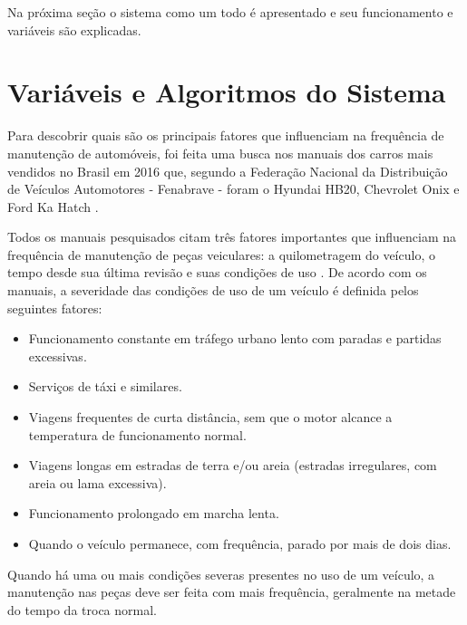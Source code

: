 \documentclass[12pt]{article}
\begin{document}
Na próxima seção o sistema como um todo é apresentado e seu funcionamento e
variáveis são explicadas.

\section{Variáveis e Algoritmos do Sistema} \label{sec:algoritmos}
Para descobrir quais são os principais fatores que influenciam na frequência de
manutenção de automóveis, foi feita uma busca nos manuais dos carros mais vendidos
no Brasil em 2016 que, segundo a Federação Nacional da Distribuição de Veículos
Automotores - Fenabrave - foram o Hyundai HB20, Chevrolet Onix e Ford Ka Hatch
\cite{fenabrave}.

Todos os manuais pesquisados citam três fatores importantes que influenciam na
frequência de manutenção de peças veiculares: a quilometragem do veículo, o
tempo desde sua última revisão e suas condições de uso \cite{manualhyundai,
manualonix, manualka}. De acordo com os manuais, a severidade das condições de
uso de um veículo é definida pelos seguintes fatores:

\begin{itemize}
  \item Funcionamento constante em tráfego urbano lento com paradas e partidas
  excessivas.
  \item Serviços de táxi e similares.
  \item Viagens frequentes de curta distância, sem que o motor alcance a
  temperatura de funcionamento normal.
  \item Viagens longas em estradas de terra e/ou areia (estradas irregulares,
  com areia ou lama excessiva).
  \item Funcionamento prolongado em marcha lenta.
  \item Quando o veículo permanece, com frequência, parado por mais de dois
  dias.
\end{itemize}

Quando há uma ou mais condições severas presentes no uso de um veículo, a
manutenção nas peças deve ser feita com mais frequência, geralmente na metade do
tempo da troca normal.
\end{document}
